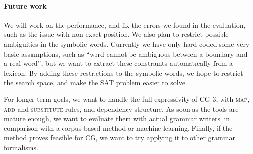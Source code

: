 




\paragraph{Future work} 

We will work on the performance, and fix the errors we found in the
evaluation, such as the issue with non-exact position.
We also plan to restrict possible ambiguities in the symbolic words. 
Currently we have only hard-coded some
very basic assumptions, such as ``word cannot be ambiguous between a
boundary and a real word'', but we want to extract these constraints
automatically from a lexicon.
By adding these restrictions to the symbolic words, we hope to
restrict the search space, and make the SAT problem easier to solve.

For longer-term goals, we want to handle the full expressivity of CG-3,
with \textsc{map}, \textsc{add} and \textsc{substitute} rules, and
dependency structure.
As soon as the tools are mature enough, we want to
evaluate them with actual grammar writers,
in comparison with a corpus-based method or machine learning.
Finally, if the method proves feasible for CG, we want
to try applying it to other grammar formalisms.


